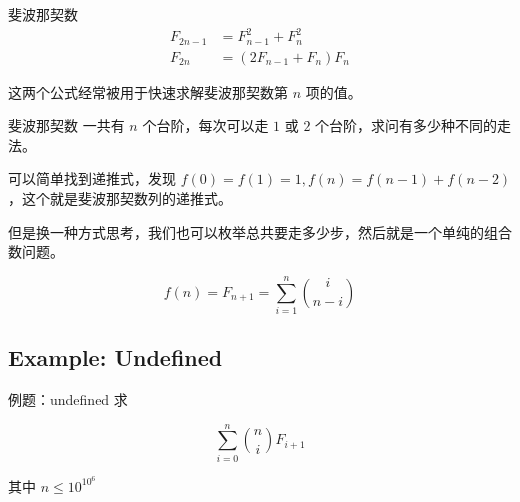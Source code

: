 \documentclass[12pt,aspectratio=169,handout]{beamer}
\begin{document}
\begin{frame}[fragile]{斐波那契数}
  $$
  \begin{aligned}
    F_{2n-1} &= F_{n-1}^2 + F_{n}^2 \\
    F_{2n} &= (2 F_{n-1}+  F_{n}) F_{n}
  \end{aligned}
  $$

  这两个公式经常被用于快速求解斐波那契数第 $n$ 项的值。
\end{frame}

\begin{frame}[fragile]{斐波那契数}
  一共有 $n$ 个台阶，每次可以走 $1$ 或 $2$ 个台阶，求问有多少种不同的走法。\pause

  可以简单找到递推式，发现 $f(0) = f(1) = 1, f(n) = f(n-1) + f(n-2)$，这个就是斐波那契数列的递推式。\pause

  但是换一种方式思考，我们也可以枚举总共要走多少步，然后就是一个单纯的组合数问题。\pause

  $$
  f(n) = F_{n+1} = \sum_{i=1}^{n} {i \choose n-i}
  $$
\end{frame}

\subsection[例题：undefined]{Example: Undefined}

\begin{frame}[fragile]{例题：undefined}
求

$$
\sum_{i=0}^n {n \choose i} F_{i+1}
$$

其中 $n \le 10^{10^6}$
\end{frame}

\end{document}
